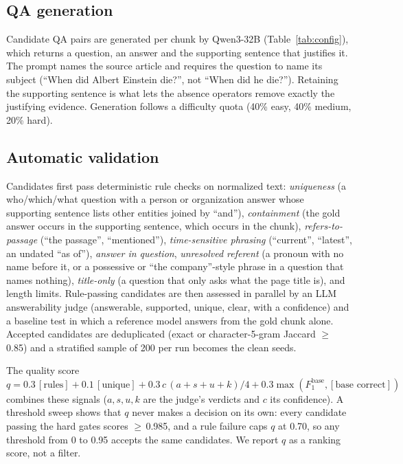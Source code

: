 \documentclass[conference]{IEEEtran}
\begin{document}
\subsection{QA generation}
Candidate QA pairs are generated per chunk by Qwen3-32B (Table~\ref{tab:config}), which returns a
question, an answer and the supporting sentence that justifies it. The prompt names the source
article and requires the question to name its subject (``When did Albert Einstein die?'', not
``When did he die?''). Retaining the supporting sentence is what lets the absence operators
remove exactly the justifying evidence. Generation follows a difficulty quota (40\% easy,
40\% medium, 20\% hard).

\subsection{Automatic validation}
\label{sec:validation}
Candidates first pass deterministic rule checks on normalized text: \emph{uniqueness}
(a who/which/what question with a person or organization answer whose supporting sentence lists
other entities joined by ``and''), \emph{containment} (the gold answer occurs in the supporting
sentence, which occurs in the chunk), \emph{refers-to-passage} (``the passage'',
``mentioned''), \emph{time-sensitive phrasing} (``current'', ``latest'', an undated ``as of''),
\emph{answer in question}, \emph{unresolved referent} (a pronoun with no name before it, or a
possessive or ``the company''-style phrase in a question that names nothing),
\emph{title-only} (a question that only asks what the page title is), and length limits. Rule-passing candidates are then
assessed in parallel by an LLM answerability judge (answerable, supported, unique, clear, with a
confidence) and a baseline test in which a reference model answers from the gold chunk alone.
Accepted candidates are deduplicated (exact or character-5-gram Jaccard $\ge$\,0.85) and a
stratified sample of 200 per run becomes the clean seeds.

The quality score $q = 0.3\,[\text{rules}] + 0.1\,[\text{unique}] + 0.3\,c\,(a{+}s{+}u{+}k)/4 +
0.3\max(F_1^{\text{base}}, [\text{base correct}])$ combines these signals ($a,s,u,k$ are the
judge's verdicts and $c$ its confidence). A threshold sweep shows that $q$ never makes a
decision on its own: every candidate passing the hard gates scores $\ge$\,0.985, and a rule
failure caps $q$ at 0.70, so any threshold from 0 to 0.95 accepts the same candidates. We report
$q$ as a ranking score, not a filter.
\end{document}
